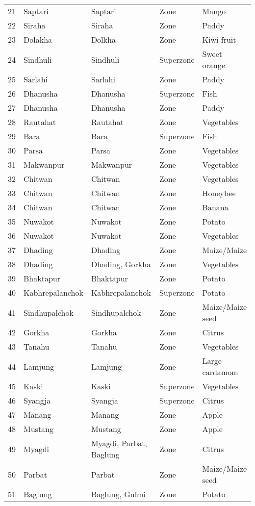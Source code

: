 \documentclass[]{article}
\begin{document}
\begin{longtable}{lllll}
21 & Saptari & Saptari & Zone & Mango\\
22 & Siraha & Siraha & Zone & Paddy\\
23 & Dolakha & Dolkha & Zone & Kiwi fruit\\
24 & Sindhuli & Sindhuli & Superzone & Sweet orange\\
25 & Sarlahi & Sarlahi & Zone & Paddy\\
26 & Dhanusha & Dhanusha & Superzone & Fish\\
27 & Dhanusha & Dhanusha & Zone & Paddy\\
28 & Rautahat & Rautahat & Zone & Vegetables\\
29 & Bara & Bara & Superzone & Fish\\
30 & Parsa & Parsa & Zone & Vegetables\\
31 & Makwanpur & Makwanpur & Zone & Vegetables\\
32 & Chitwan & Chitwan & Zone & Vegetables\\
33 & Chitwan & Chitwan & Zone & Honeybee\\
34 & Chitwan & Chitwan & Zone & Banana\\
35 & Nuwakot & Nuwakot & Zone & Potato\\
36 & Nuwakot & Nuwakot & Zone & Vegetables\\
37 & Dhading & Dhading & Zone & Maize/Maize\\
38 & Dhading & Dhading, Gorkha & Zone & Vegetables\\
39 & Bhaktapur & Bhaktapur & Zone & Potato\\
40 & Kabhrepalanchok & Kabhrepalanchok & Superzone & Potato\\
41 & Sindhupalchok & Sindhupalchok & Zone & Maize/Maize seed\\
42 & Gorkha & Gorkha & Zone & Citrus\\
43 & Tanahu & Tanahu & Zone & Vegetables\\
44 & Lamjung & Lamjung & Zone & Large cardamom\\
45 & Kaski & Kaski & Superzone & Vegetables\\
46 & Syangja & Syangja & Superzone & Citrus\\
47 & Manang & Manang & Zone & Apple\\
48 & Mustang & Mustang & Zone & Apple\\
49 & Myagdi & Myagdi, Parbat, Baglung & Zone & Citrus\\
50 & Parbat & Parbat & Zone & Maize/Maize seed\\
51 & Baglung & Baglung, Gulmi & Zone & Potato\\

\end{longtable}
\end{document}

